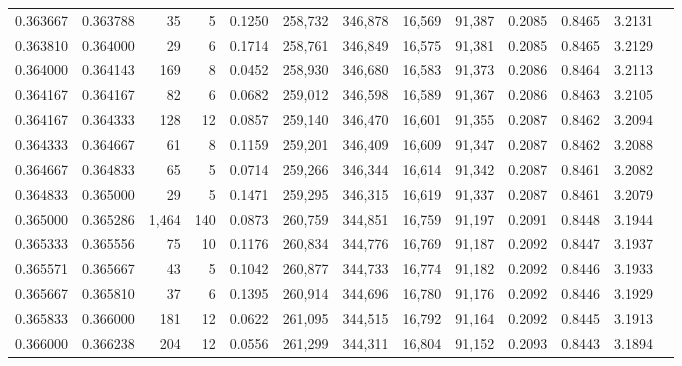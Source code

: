 \begin{tabular}{rrrrrrrrrrrrr}
0.363667 & 0.363788 &    35 &   5 &                                     0.1250 & 258,732 & 346,878 &  16,569 &  91,387 & 0.2085 & 0.8465 & 3.2131 \\
0.363810 & 0.364000 &    29 &   6 &                                     0.1714 & 258,761 & 346,849 &  16,575 &  91,381 & 0.2085 & 0.8465 & 3.2129 \\
0.364000 & 0.364143 &   169 &   8 &                                     0.0452 & 258,930 & 346,680 &  16,583 &  91,373 & 0.2086 & 0.8464 & 3.2113 \\
0.364167 & 0.364167 &    82 &   6 &                                     0.0682 & 259,012 & 346,598 &  16,589 &  91,367 & 0.2086 & 0.8463 & 3.2105 \\
0.364167 & 0.364333 &   128 &  12 &                                     0.0857 & 259,140 & 346,470 &  16,601 &  91,355 & 0.2087 & 0.8462 & 3.2094 \\
0.364333 & 0.364667 &    61 &   8 &                                     0.1159 & 259,201 & 346,409 &  16,609 &  91,347 & 0.2087 & 0.8462 & 3.2088 \\
0.364667 & 0.364833 &    65 &   5 &                                     0.0714 & 259,266 & 346,344 &  16,614 &  91,342 & 0.2087 & 0.8461 & 3.2082 \\
0.364833 & 0.365000 &    29 &   5 &                                     0.1471 & 259,295 & 346,315 &  16,619 &  91,337 & 0.2087 & 0.8461 & 3.2079 \\
0.365000 & 0.365286 & 1,464 & 140 &                                     0.0873 & 260,759 & 344,851 &  16,759 &  91,197 & 0.2091 & 0.8448 & 3.1944 \\
0.365333 & 0.365556 &    75 &  10 &                                     0.1176 & 260,834 & 344,776 &  16,769 &  91,187 & 0.2092 & 0.8447 & 3.1937 \\
0.365571 & 0.365667 &    43 &   5 &                                     0.1042 & 260,877 & 344,733 &  16,774 &  91,182 & 0.2092 & 0.8446 & 3.1933 \\
0.365667 & 0.365810 &    37 &   6 &                                     0.1395 & 260,914 & 344,696 &  16,780 &  91,176 & 0.2092 & 0.8446 & 3.1929 \\
0.365833 & 0.366000 &   181 &  12 &                                     0.0622 & 261,095 & 344,515 &  16,792 &  91,164 & 0.2092 & 0.8445 & 3.1913 \\
0.366000 & 0.366238 &   204 &  12 &                                     0.0556 & 261,299 & 344,311 &  16,804 &  91,152 & 0.2093 & 0.8443 & 3.1894 \\

\end{tabular}
